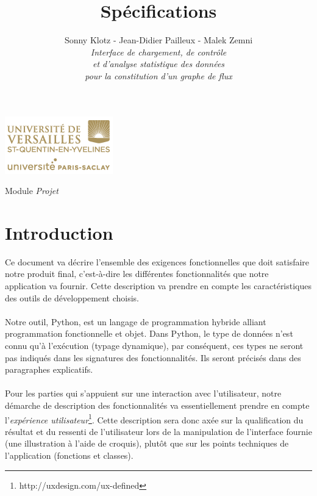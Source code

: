 

\title{\vspace{\fill}\textbf{\Huge Spécifications}}
\author{
	Sonny Klotz - Jean-Didier Pailleux - Malek Zemni
	\vspace{2em}\\
	\textit{Interface de chargement, de contrôle}\\\textit{et d’analyse statistique des données}\\\textit{pour la constitution d’un graphe de flux}
	\vspace{2em}
}


\clearpage
\maketitle\vspace{9em}
\begin{center}\includegraphics[scale=0.7]{../Cahier/logo.png}\end{center}
\begin{flushright}Module \textit{Projet}\end{flushright}
\newpage
\tableofcontents
\newpage\clearpage{}

	\section*{Introduction}
		Ce document va décrire l'ensemble des exigences fonctionnelles que doit satisfaire notre produit final, c'est-à-dire les différentes fonctionnalités que notre application va fournir. Cette description va prendre en compte les caractéristiques des outils de développement choisis.
		\paragraph{}Notre outil, Python, est un langage de programmation hybride alliant programmation fonctionnelle et objet. Dans Python, le type de données n'est connu qu'à l'exécution (typage dynamique), par conséquent, ces types ne seront pas indiqués dans les signatures des fonctionnalités. Ils seront précisés dans des paragraphes explicatifs.
		\paragraph{}Pour les parties qui s'appuient sur une interaction avec l'utilisateur, notre démarche de description des fonctionnalités va essentiellement prendre en compte l'\textit{expérience utilisateur}\footnote{http://uxdesign.com/ux-defined}. Cette description sera donc axée sur la qualification du résultat et du ressenti de l'utilisateur lors de la manipulation de l'interface fournie (une illustration à l'aide de croquis), plutôt que sur les points techniques de l'application (fonctions et classes).
